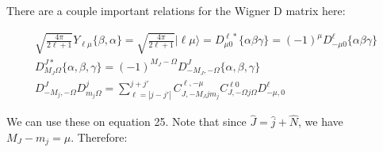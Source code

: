 \documentclass[prl, longbibliography]{revtex4-2}
\begin{document}
There are a couple important relations for the Wigner D matrix here:

\begin{equation}
\begin{split}
\sqrt{\frac{4\pi}{2\ell+1}}Y_{\ell \mu}\{\beta, \alpha\}=\sqrt{\frac{4\pi}{2\ell+1}}|\ell\mu\rangle
=D^{\ell *}_{\mu 0} \{\alpha \beta \gamma\}
=(-1)^{\mu}D^{\ell}_{-\mu 0} \{\alpha \beta \gamma\}
\\
D^{J*}_{M_J \Omega}\{\alpha,\beta,\gamma\} 
=(-1)^{M_J-\Omega} D_{-M_J,-\Omega}^J\{\alpha,\beta,\gamma\}
\\
D_{-M_j,-\Omega}^{J}
D_{m_j \Omega}^{j}
= \sum_{\ell=|j-j'|}^{j+j'}
C_{J,-M_J j m_j}^{\ell, -\mu}
C_{J,-\Omega j \Omega}^{\ell 0}
D^{\ell}_{-\mu,0}
\end{split}
\end{equation}

We can use these on equation 25. Note that since $\hat{J}=\hat{j}+\hat{N}$, we have $M_J-m_j=\mu$. Therefore:
\end{document}
